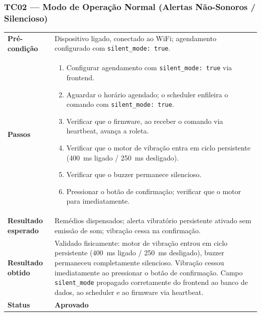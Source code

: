 \documentclass[12pt,a4paper]{article}
\newcommand{\lightrule}{\arrayrulecolor{gray!35}\midrule\arrayrulecolor{black}}
\newcommand{\aprovado}{\textcolor{green!60!black}{\textbf{Aprovado}}}
\begin{document}
\subsubsection{TC02 — Modo de Operação Normal (Alertas Não-Sonoros / Silencioso)}
\begin{table}[H]\small\setlength{\tabcolsep}{6pt}\renewcommand{\arraystretch}{1.3}
\begin{tabularx}{\textwidth}{>{\bfseries}p{4cm} X}
\toprule
Pré-condição & Dispositivo ligado, conectado ao WiFi; agendamento configurado com \texttt{silent\_mode: true}. \\
\lightrule
Passos &
\begin{enumerate}[nosep,leftmargin=*]
  \item Configurar agendamento com \texttt{silent\_mode: true} via frontend.
  \item Aguardar o horário agendado; o scheduler enfileira o comando com \texttt{silent\_mode: true}.
  \item Verificar que o firmware, ao receber o comando via heartbeat, avança a roleta.
  \item Verificar que o motor de vibração entra em ciclo persistente (400~ms ligado / 250~ms desligado).
  \item Verificar que o buzzer permanece silencioso.
  \item Pressionar o botão de confirmação; verificar que o motor para imediatamente.
\end{enumerate} \\
\lightrule
Resultado esperado & Remédios dispensados; alerta vibratório persistente ativado sem emissão de som; vibração cessa na confirmação. \\
\lightrule
Resultado obtido & Validado fisicamente: motor de vibração entrou em ciclo persistente (400~ms ligado / 250~ms desligado), buzzer permaneceu completamente silencioso. Vibração cessou imediatamente ao pressionar o botão de confirmação. Campo \texttt{silent\_mode} propagado corretamente do frontend ao banco de dados, ao scheduler e ao firmware via heartbeat. \\
\lightrule
Status & \aprovado \\
\bottomrule
\end{tabularx}\end{table}
\end{document}
